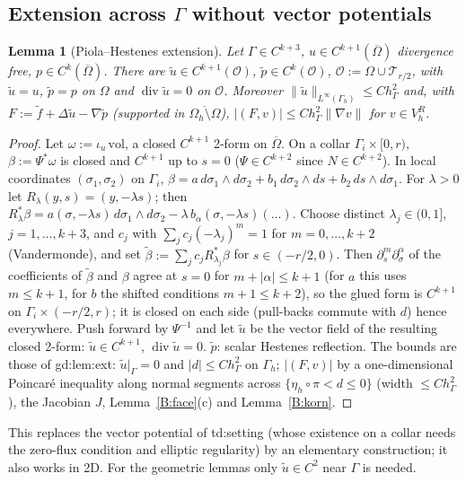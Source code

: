 \documentclass[11pt]{article}
\newtheorem{lemma}[theorem]{Lemma}
\theoremstyle{definition}
\newcommand{\hG}{h_\Gamma}
\newcommand{\Gh}{\Gamma_h}
\newcommand{\Oh}{\Omega_h}
\newcommand{\VR}{V_h^R}
\newcommand{\ut}{\tilde u}
\newcommand{\pt}{\tilde p}
\newcommand{\ft}{\tilde f}
\newcommand{\norm}[1]{\lVert #1\rVert}
\renewcommand{\div}{\operatorname{div}}
\begin{document}
\subsection{Extension across $\Gamma$ without vector potentials}
\begin{lemma}[Piola--Hestenes extension]\label{B:ext}
Let $\Gamma\in C^{k+3}$, $u\in C^{k+1}(\overline\Omega)$ divergence free, $p\in C^k(\overline\Omega)$. There are $\ut\in C^{k+1}(\mathcal O)$, $\pt\in C^k(\mathcal O)$, $\mathcal O:=\Omega\cup\mathcal T_{r/2}$, with $\ut=u$, $\pt=p$ on $\Omega$ and $\div\ut=0$ on $\mathcal O$. Moreover $\norm{\ut}_{L^\infty(\Gh)}\le C\hG^2$ and, with $F:=\ft+\Delta\ut-\nabla\pt$ (supported in $\overline{\Oh\setminus\Omega}$), $|(F,v)|\le C\hG^2\norm{\nabla v}$ for $v\in\VR$.
\end{lemma}
\begin{proof}
Let $\omega:=\iota_u\,\mathrm{vol}$, a closed $C^{k+1}$ 2-form on $\overline\Omega$. On a collar $\Gamma_i\times[0,r)$, $\beta:=\Psi^\ast\omega$ is closed and $C^{k+1}$ up to $s=0$ ($\Psi\in C^{k+2}$ since $N\in C^{k+2}$). In local coordinates $(\sigma_1,\sigma_2)$ on $\Gamma_i$, $\beta=a\,d\sigma_1\wedge d\sigma_2+b_1\,d\sigma_2\wedge ds+b_2\,ds\wedge d\sigma_1$. For $\lambda>0$ let $R_\lambda(y,s)=(y,-\lambda s)$; then $R_\lambda^\ast\beta=a(\sigma,-\lambda s)\,d\sigma_1\wedge d\sigma_2-\lambda\,b_\alpha(\sigma,-\lambda s)(\dots)$. Choose distinct $\lambda_j\in(0,1]$, $j=1,\dots,k+3$, and $c_j$ with $\sum_jc_j(-\lambda_j)^m=1$ for $m=0,\dots,k+2$ (Vandermonde), and set $\tilde\beta:=\sum_jc_jR_{\lambda_j}^\ast\beta$ for $s\in(-r/2,0)$. Then $\partial_s^m\partial_\sigma^\alpha$ of the coefficients of $\tilde\beta$ and $\beta$ agree at $s=0$ for $m+|\alpha|\le k+1$ (for $a$ this uses $m\le k+1$, for $b$ the shifted conditions $m+1\le k+2$), so the glued form is $C^{k+1}$ on $\Gamma_i\times(-r/2,r)$; it is closed on each side (pull-backs commute with $d$) hence everywhere. Push forward by $\Psi^{-1}$ and let $\ut$ be the vector field of the resulting closed 2-form: $\ut\in C^{k+1}$, $\div\ut=0$. $\pt$: scalar Hestenes reflection. The bounds are those of gd:lem:ext: $\ut|_\Gamma=0$ and $|d|\le C\hG^2$ on $\Gh$; $|(F,v)|$ by a one-dimensional Poincar\'e inequality along normal segments across $\{\eta_h\circ\pi<d\le0\}$ (width $\le C\hG^2$), the Jacobian $J$, Lemma~\ref{B:face}(c) and Lemma~\ref{B:korn}.
\end{proof}
This replaces the vector potential of td:setting (whose existence on a collar needs the zero-flux condition and elliptic regularity) by an elementary construction; it also works in 2D. For the geometric lemmas only $\ut\in C^2$ near $\Gamma$ is needed.
\end{document}
